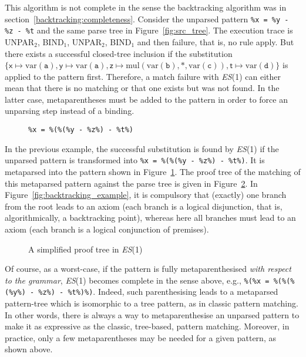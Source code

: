 This algorithm is not complete in the sense the backtracking algorithm
was in section~\ref{backtracking:completeness}. Consider the unparsed
pattern \texttt{\%x = \%y - \%z - \%t} and the same parse tree in
Figure~\ref{fig:src_tree}. The execution trace is
\textsf{UNPAR}\(_2\), \textsf{BIND}\(_1\), \textsf{UNPAR}\(_2\),
\textsf{BIND}\(_1\) and then failure, that is, no rule apply. But
there exists a successful closed\hyp{}tree inclusion if the
substitution \(\{\textsf{x} \mapsto \text{var}(\texttt{a}), \textsf{y}
\mapsto \text{var}(\texttt{a}), \textsf{z} \mapsto
\text{mul}(\text{var}(\texttt{b}), \texttt{*},
\text{var}(\texttt{c})), \textsf{t} \mapsto \text{var}(\texttt{d})\}\)
is applied to the pattern first. Therefore, a match failure with
\textit{ES}(1) can either mean that there is no matching or that one
exists but was not found. In the latter case, meta\-parentheses must
be added to the pattern in order to force an unparsing step instead of
a binding.
\begin{figure}[b]
\caption{\texttt{\%x = \%(\%(\%y - \%z\%) - \%t\%)}\label{fig:meta}}
\end{figure}
In the previous example, the successful substitution is found by
\textit{ES}(1) if the unparsed pattern is transformed into \texttt{\%x
= \%(\%(\%y - \%z\%) - \%t\%)}. It is meta\-parsed into the pattern
shown in Figure~\ref{fig:meta}. The proof tree of the matching of this
meta\-parsed pattern against the parse tree is given in
Figure~\ref{fig:trace_es1}. In Figure~\ref{fig:backtracking_example},
it is compulsory that (exactly) one branch from the root leads to an
axiom (each branch is a logical disjunction, that is, algorithmically,
a backtracking point), whereas here all branches must lead to an axiom
(each branch is a logical conjunction of premises).
\begin{figure}[t]
\caption{A simplified proof tree in \textit{ES}(1)\label{fig:trace_es1}}
\end{figure}

Of course, as a worst\hyp{}case, if the pattern is fully
meta\-parenthesised \emph{with respect to the grammar}, \textit{ES}(1)
becomes complete in the sense above, e.g., \texttt{\%(\%x =
\%(\%(\%(\%y\%) - \%z\%) - \%t\%)\%)}. Indeed, such parenthesising
leads to a meta\-parsed pattern\hyp{}tree which is isomorphic to a
tree pattern, as in classic pattern matching. In other words, there is
always a way to meta\-parenthesise an unparsed pattern to make it as
expressive as the classic, tree\hyp{}based, pattern
matching. Moreover, in practice, only a few meta\-parentheses may be
needed for a given pattern, as shown above.

